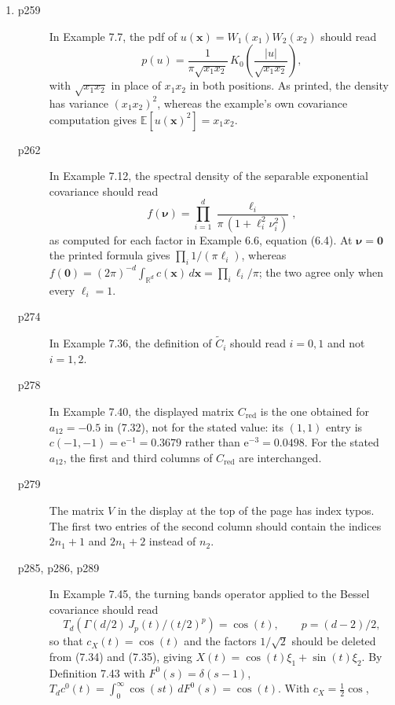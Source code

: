 \documentclass[final]{article}
\theoremstyle{definition}
\newcommand{\vecbs}[1]{\boldsymbol{#1}}
\renewcommand{\vec}[1]{{\vecbs{#1}}}
\begin{document}
\begin{enumerate}
\begin{description}
Only $\ell=0.1$, for which $[0,1]$ already spans ten correlation lengths, gives
a non-negative definite $\widetilde{C}$ at every $N$. The intended reading is to
pad, that is, to extend the sampled interval at fixed spacing $\Delta t$; the
minimal extension then becomes non-negative definite once the interval covers
about five correlation lengths.
   \end{description}
 \item%
 \begin{description}
   \item[p259] In Example 7.7, the pdf of $u(\vec x)=W_1(x_1)W_2(x_2)$ should read
\[
p(u)=\frac{1}{\pi\sqrt{x_1x_2}}\,K_0\!\left(\frac{|u|}{\sqrt{x_1x_2}}\right),
\]
with $\sqrt{x_1x_2}$ in place of $x_1x_2$ in both positions. As printed, the
density has variance $(x_1x_2)^2$, whereas the example's own covariance
computation gives $\mathbb{E}[u(\vec x)^2]=x_1x_2$.
   \item[p262] In Example 7.12, the spectral density of the separable exponential
covariance should read
\[
f(\vec\nu)=\prod_{i=1}^{d}\frac{\ell_i}{\pi\,(1+\ell_i^2\nu_i^2)},
\]
as computed for each factor in Example 6.6, equation (6.4). At $\vec\nu=\vec 0$
the printed formula gives $\prod_i 1/(\pi\ell_i)$, whereas
$f(\vec 0)=(2\pi)^{-d}\int_{\mathbb{R}^d}c(\vec x)\,d\vec x=\prod_i \ell_i/\pi$;
the two agree only when every $\ell_i=1$.
   \item[p274] In Example 7.36, the definition of $\widetilde C_i$ should read
$i=0,1$ and not $i=1,2$.
   \item[p278] In Example 7.40, the displayed matrix $C_{\mathrm{red}}$ is the one
obtained for $a_{12}=-0.5$ in (7.32), not for the stated value: its $(1,1)$ entry is
$c(-1,-1)=\mathrm{e}^{-1}=0.3679$ rather than $\mathrm{e}^{-3}=0.0498$. For the
stated $a_{12}$, the first and third columns of $C_{\mathrm{red}}$ are
interchanged.
   \item[p279] The matrix $V$ in the display at the top of the page has index typos. The first two entries of the second column should contain the
indices $2n_1+1$ and $2n_1 + 2$ instead of $n_2$.
   \item[p285, p286, p289] In Example 7.45, the turning bands operator applied to
the Bessel covariance should read
\[
T_d\!\left(\Gamma(d/2)\,J_p(t)/(t/2)^p\right)=\cos(t),\qquad p=(d-2)/2,
\]
so that $c_X(t)=\cos(t)$ and the factors $1/\sqrt2$ should be deleted from (7.34)
and (7.35), giving $X(t)=\cos(t)\xi_1+\sin(t)\xi_2$. By Definition 7.43 with $F^0(s)=\delta(s-1)$,
$T_dc^0(t)=\int_0^\infty\cos(st)\,dF^0(s)=\cos(t)$. With $c_X=\tfrac12\cos$,

\end{description}
\end{enumerate}
\end{document}
